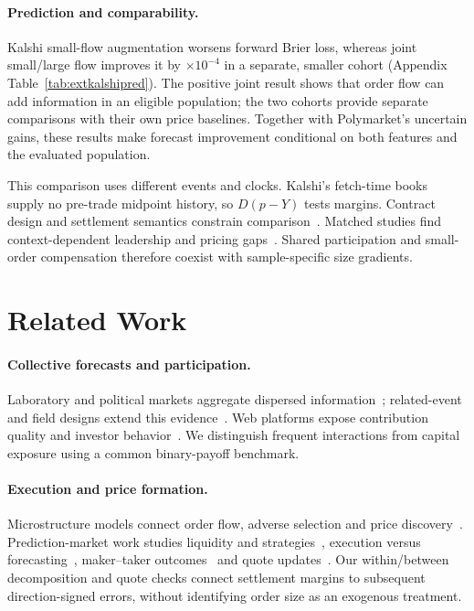 \documentclass[sigconf,anonymous,nonacm,balance=false]{acmart}
\begin{document}
\paragraph{Prediction and comparability.}
Kalshi small-flow augmentation worsens forward Brier loss, whereas joint small/large flow improves it by \KalBothG{} $\times10^{-4}$ in a separate, smaller cohort (Appendix Table~\ref{tab:extkalshipred}). The positive joint result shows that order flow can add information in an eligible population; the two cohorts provide separate comparisons with their own price baselines. Together with Polymarket's uncertain gains, these results make forecast improvement conditional on both features and the evaluated population.

This comparison uses different events and clocks. Kalshi's fetch-time books supply no pre-trade midpoint history, so $D(p-Y)$ tests margins. Contract design and settlement semantics constrain comparison~\cite{lee2026derivatives,gebele2026semantic}. Matched studies find context-dependent leadership and pricing gaps~\cite{ng2026discovery,aktug2026discovery,rothschild2014misalignment,zitzewitz2026limits}. Shared participation and small-order compensation therefore coexist with sample-specific size gradients.

\section{Related Work}
\paragraph{Collective forecasts and participation.}
Laboratory and political markets aggregate dispersed information~\cite{plott1988rational,forsythe1992anatomy,wolfers2004prediction,arrow2008promise}; related-event and field designs extend this evidence~\cite{hanson2003combinatorial,berg2008accuracy,berg2008results,cowgill2015corporate}. Web platforms expose contribution quality and investor behavior~\cite{horvat2023hidden,soska2021derivatives,kawai2023neighbor,victor2021wash}. We distinguish frequent interactions from capital exposure using a common binary-payoff benchmark.

\paragraph{Execution and price formation.}
Microstructure models connect order flow, adverse selection and price discovery~\cite{kyle1985continuous,glosten1985bid,easley1987price,glosten1988estimating,hasbrouck1991measuring,huang1997components,madhavan1997why}. Prediction-market work studies liquidity and strategies~\cite{tetlock2008liquidity,rothschild2016trading,bossaerts2024price}, execution versus forecasting~\cite{dellavedova2026profits}, maker--taker outcomes~\cite{burgi2026makers,becker2026microstructure,akey2026who} and quote updates~\cite{akey2026quotes}. Our within/between decomposition and quote checks connect settlement margins to subsequent direction-signed errors, without identifying order size as an exogenous treatment.
\end{document}
